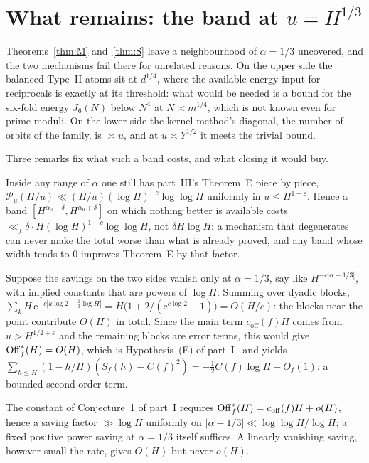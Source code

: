\documentclass[11pt,a4paper]{article}
\begin{document}
\section{What remains: the band at $u=H^{1/3}$}
Theorems~\ref{thm:M} and~\ref{thm:S} leave a neighbourhood of $\alpha=1/3$ uncovered, and the two mechanisms fail there for unrelated reasons. On the upper side the balanced
Type~II atoms sit at $d^{1/4}$, where the available energy input for reciprocals is exactly at its threshold: what would be needed is a bound for the six-fold energy
$J_6(N)$ below $N^4$ at $N\asymp m^{1/4}$, which is not known even for prime moduli. On the lower side the kernel method's diagonal, the number of orbits of the family, is
$\asymp u$, and at $u\asymp Y^{1/2}$ it meets the trivial bound.

Three remarks fix what such a band costs, and what closing it would buy.

\begin{remark}
Inside any range of $\alpha$ one still has part~III's Theorem~E piece by piece, $\mathcal P_u(H/u)\ll(H/u)(\log H)^{-c}\log\log H$ uniformly in $u\le H^{1-\varepsilon}$. Hence a band
$[H^{\alpha_0-\delta},H^{\alpha_0+\delta}]$ on which nothing better is available costs $\ll_f\delta\cdot H(\log H)^{1-c}\log\log H$, not $\delta H\log H$: a mechanism that
degenerates can never make the total worse than what is already proved, and any band whose width tends to $0$ improves Theorem~E by that factor.
\end{remark}

\begin{remark}
Suppose the savings on the two sides vanish only at $\alpha=1/3$, say like $H^{-c|\alpha-1/3|}$, with implied constants that are powers of $\log H$. Summing over dyadic blocks,
$\sum_kH\,\mathrm{e}^{-c|k\log2-\frac13\log H|}=H\bigl(1+2/(\mathrm{e}^{c\log2}-1)\bigr)=O(H/c)$: the blocks near the point contribute $O(H)$ in total. Since the main term
$c_{\mathrm{off}}(f)H$ comes from $u>H^{1/2+\varepsilon}$ and the remaining blocks are error terms, this would give $\mathrm{Off}^\ast_f(H)=O(H)$, which is Hypothesis~(E) of
part~I~\cite{ReichardtI} and yields $\sum_{h\le H}(1-h/H)(S_f(h)-C(f)^2)=-\tfrac12C(f)\log H+O_f(1)$: a bounded second-order term.
\end{remark}

\begin{remark}
The constant of Conjecture~1 of part~I requires $\mathrm{Off}^\ast_f(H)=c_{\mathrm{off}}(f)H+o(H)$, hence a saving factor $\gg\log H$ uniformly on $|\alpha-1/3|\ll\log\log H/\log H$; a
fixed positive power saving at $\alpha=1/3$ itself suffices. A linearly vanishing saving, however small the rate, gives $O(H)$ but never $o(H)$.
\end{remark}
\end{document}
